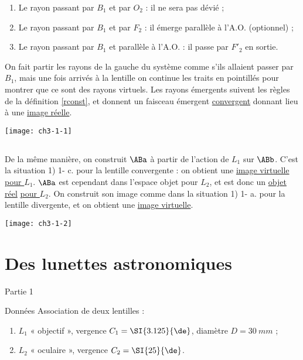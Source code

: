 \documentclass[../main/main.tex]{subfiles}
\begin{document}
\begin{enumerate}
    \item Le rayon passant par $B_1$ et par $O_2$ : il ne sera pas dévié ;
    \item Le rayon passant par $B_1$ et par $F_2$ : il émerge parallèle à l'A.O.
        (optionnel) ;
    \item Le rayon passant par $B_1$ et parallèle à l'A.O. : il passe par $F'_2$
        en sortie.
\end{enumerate}

On fait partir les rayons de la gauche du système comme s'ils allaient passer
par $B_1$, mais une fois arrivés à la lentille on continue les traits en
pointillés pour montrer que ce sont des rayons virtuels. Les rayons émergents
suivent les règles de la définition \ref{rconst}, et donnent un faisceau
émergent \underline{convergent} donnant lieu à une \underline{image réelle}.

\begin{center}
    \texttt{[image: ch3-1-1]}
\end{center}

\subsection{}
De la même manière, on construit $\ABa$ à partir de l'action de $L_1$ sur
$\ABb$.  C'est la situation 1) 1- c. pour la lentille convergente : on obtient
une \underline{image virtuelle} \underline{\underline{pour $L_1$}}. $\ABa$ est
cependant dans l'espace objet pour $L_2$, et est donc un \underline{objet réel}
\underline{\underline{pour $L_2$}}. On construit son image comme dans la
situation 1) 1- a. pour la lentille divergente, et on obtient une
\underline{image virtuelle}.

\begin{center}
    \texttt{[image: ch3-1-2]}
\end{center}

\section{Des lunettes astronomiques}
\begin{center}
    \huge Partie 1
\end{center}

\begin{center}
    \begin{NCdefi}[width=.7\linewidth]{Données}
    Association de deux lentilles :
    \begin{enumerate}
        \item $L_1$ « objectif », vergence $C_1 = \SI{3.125}{\de}$, diamètre $D
            = \SI{30}{mm}$ ;
        \item $L_2$ « oculaire », vergence $C_2 = \SI{25}{\de}$.
    \end{enumerate}
\end{NCdefi}
\end{center}
\end{document}

